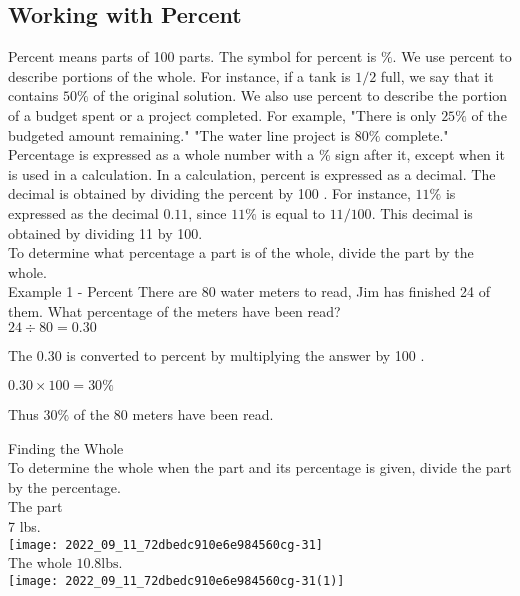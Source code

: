 \subsection{Working with Percent}
Percent means parts of 100 parts. The symbol for percent is $\%$. We use percent to describe portions of the whole. For instance, if a tank is $1 / 2$ full, we say that it contains $50 \%$ of the original solution. We also use percent to describe the portion of a budget spent or a project completed. For example, "There is only $25 \%$ of the budgeted amount remaining." "The water line project is $80 \%$ complete."\\

Percentage is expressed as a whole number with a \% sign after it, except when it is used in a calculation. In a calculation, percent is expressed as a decimal. The decimal is obtained by dividing the percent by 100 . For instance, $11 \%$ is expressed as the decimal $0.11$, since $11 \%$ is equal to $11 / 100$. This decimal is obtained by dividing 11 by 100.\\

To determine what percentage a part is of the whole, divide the part by the whole.\\

Example 1 - Percent
There are 80 water meters to read, Jim has finished 24 of them. What percentage of the meters have been read?\\

$24 \div 80=0.30$

The $0.30$ is converted to percent by multiplying the answer by 100 .

$0.30 \times 100=30 \%$

Thus $30 \%$ of the 80 meters have been read.

Finding the Whole\\
To determine the whole when the part and its percentage is given, divide the part by the percentage.\\

The part\\

7 lbs.\\

\texttt{[image: 2022\_09\_11\_72dbedc910e6e984560cg-31]}\\

The whole $10.8 \mathrm{lbs}$.\\

\texttt{[image: 2022\_09\_11\_72dbedc910e6e984560cg-31(1)]}\\

